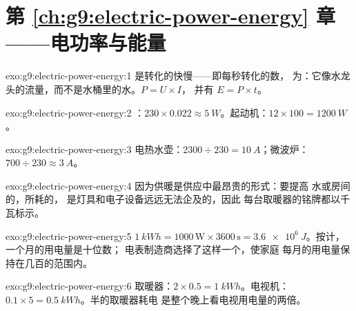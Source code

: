 \section*{第 \ref{ch:g9:electric-power-energy} 章——电功率与能量}

\begin{solution}{exo:g9:electric-power-energy:1}
是转化的快慢——即每秒转化的数，
为：它像水龙头的流量，而不是水桶里的水。$P = U \times I$，
并有 $E = P \times t$。
\end{solution}

\begin{solution}{exo:g9:electric-power-energy:2}
：$230 \times 0.022 \approx \qty{5}{W}$。起动机：$12
\times 100 = \qty{1200}{W}$。
\end{solution}

\begin{solution}{exo:g9:electric-power-energy:3}
电热水壶：$2300 \div 230 = \qty{10}{A}$；微波炉：$700 \div
230 \approx \qty{3}{A}$。
\end{solution}

\begin{solution}{exo:g9:electric-power-energy:4}
因为供暖是供应中最昂贵的形式：要提高
水或房间的，所耗的，
是灯具和电子设备远远无法企及的，因此
每台取暖器的铭牌都以千瓦标示。
\end{solution}

\begin{solution}{exo:g9:electric-power-energy:5}
$\qty{1}{kWh} = 1000 \, \text{W} \times 3600 \, \text{s} =
\qty{3.6e6}{J}$。按计，一个月的用电量是十位数；
电表制造商选择了这样一个，使家庭
每月的用电量保持在几百的范围内。
\end{solution}

\begin{solution}{exo:g9:electric-power-energy:6}
取暖器：$2 \times 0.5 = \qty{1}{kWh}$。电视机：$0.1
\times 5 = \qty{0.5}{kWh}$。半的取暖器耗电
是整个晚上看电视用电量的两倍。
\end{solution}

